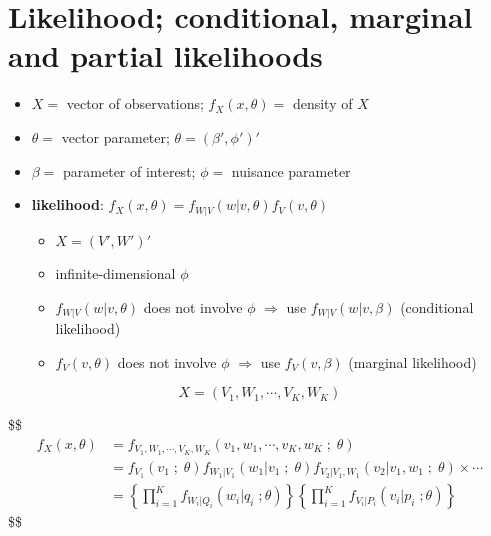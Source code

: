 \documentclass[
]{book}
\providecommand{\tightlist}{%
  \setlength{\itemsep}{0pt}\setlength{\parskip}{0pt}}
\theoremstyle{definition}
\theoremstyle{definition}
\theoremstyle{definition}
\theoremstyle{definition}
\theoremstyle{remark}
\begin{document}
\hypertarget{likelihood-conditional-marginal-and-partial-likelihoods}{%
\section{Likelihood; conditional, marginal and partial likelihoods}\label{likelihood-conditional-marginal-and-partial-likelihoods}}

\begin{itemize}
\item
  \(X =\) vector of observations; \(f_X(x, \theta) =\) density of \(X\)
\item
  \(\theta =\) vector parameter; \(\theta = (\beta ' , \phi')'\)
\item
  \(\beta =\) parameter of interest; \(\phi =\) nuisance parameter
\item
  \textbf{likelihood}: \(f_X(x, \theta) = f_{W|V} (w \Big | v, \theta )f_V (v, \theta)\)

  \begin{itemize}
  \tightlist
  \item
    \(X = (V', W')'\)
  \item
    infinite-dimensional \(\phi\)
  \item
    \(f_{W|V} (w \Big | v, \theta )\) does not involve \(\phi\) \(\Rightarrow\) use \(f_{W|V} (w \Big | v, \beta )\) (conditional likelihood)
  \item
    \(f_V (v, \theta)\) does not involve \(\phi\) \(\Rightarrow\) use \(f_V (v, \beta)\) (marginal likelihood)
  \end{itemize}
\end{itemize}

\[
X = (V_1 , W_1 , \cdots, V_K , W_K)
\]

\$\$
\begin{align}


f_X(x, \theta) &= f_{V_1 , W_1 , \cdots, V_K , W_K} (v_1 , w_1 , \cdots, v_K , w_K\; ;\; \theta)
\\

&= 
f_{V_1}(v_1 \; ; \; \theta)

f_{W_1 | V_1}(w_1 | v_1\; ; \; \theta)

f_{V_2 | V_1, W_1}(v_2 |  v_1, w_1\; ; \; \theta) \times \cdots

\\

&= \left \{ \prod_{i=1}^K f_{W_i | Q_i } (w_i \Big | q_i \; ; \theta) \right \}


\left \{ \prod_{i=1}^K f_{V_i | P_i } (v_i \Big | p_i \; ; \theta) \right \}

\end{align}
\$\$
\end{document}
